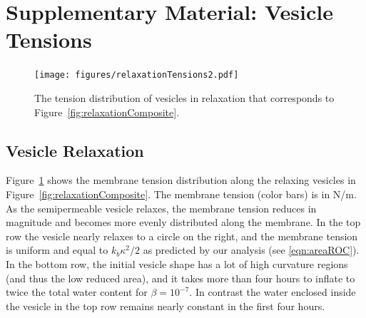 \documentclass[9pt,twocolumn,twoside,lineno]{pnas-new}
\newif\ifTikz
\begin{document}

\section*{Supplementary Material: Vesicle Tensions}
\begin{figure}[htp]
  \centering
  \texttt{[image: figures/relaxationTensions2.pdf]}
%    
  \caption{\label{fig:relaxationTensions} The tension distribution of
  vesicles in relaxation that corresponds to
  Figure~\ref{fig:relaxationComposite}.}
\end{figure}


\subsection*{Vesicle Relaxation}
Figure~\ref{fig:relaxationTensions} shows the membrane tension
distribution along the relaxing vesicles in
Figure~\ref{fig:relaxationComposite}. The membrane tension (color bars)
is in N/m. As the semipermeable vesicle relaxes, the membrane tension
reduces in magnitude and becomes more evenly distributed along the
membrane. In the top row the vesicle nearly relaxes to a circle on the
right, and the membrane tension is uniform and equal to $k_b \kappa^2/2$
as predicted by our analysis (see \eqref{eqn:areaROC}). In the bottom
row, the initial vesicle shape has a lot of high curvature regions (and
thus the low reduced area), and it takes more than four hours to inflate
to twice the total water content for $\beta=10^{-7}$. In contrast the
water enclosed inside the vesicle in the top row remains nearly constant
in the first four hours.
\end{document}
